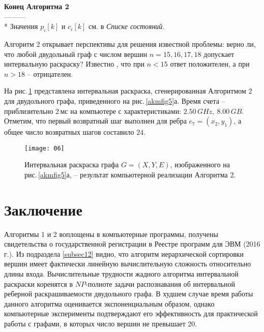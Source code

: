 \textbf{ Конец Алгоритма 2}\\
---------\\
* Значения $p_i[k]$ и $c_i[k]$ см. в \textit{ Списке состояний}.
\par\medskip
Алгоритм 2 открывает перспективы для решения известной проблемы: верно ли, что любой двудольный граф с числом вершин $n=15,16,17,18$ допускает интервальную раскраску? Известно \cite{akm-15Giaro}, что при $n<15$ ответ положителен, а при $n>18$ -- отрицателен.

На рис.\,\ref{akmfig6} представлена интервальная раскраска, сгенерированная Алгоритмом 2 для двудольного графа, приведенного на рис.\,\ref{akmfig5}а. Время счета -- приблизительно 2\,мс на компьютере с характеристиками: $2.50\,GHz,\ 8.00\,GB$. Отметим, что первый возвратный шаг выполнен для ребра $e_7=(x_2, y_1)$, а общее число возвратных шагов составило $24$.
\begin{figure}[H]
\centerline{\texttt{[image: 06]}}
\caption{Интервальная раскраска графа ${G=(X,Y,E)}$, изображенного на рис.\,\ref{akmfig5}а, -- \vspace{-1mm} результат компьютерной реализации Алгоритма 2.}
\label{akmfig6}
\end{figure}
\par\medskip
\section{Заключение}
Алгоритмы 1 и 2 воплощены в компьютерные программы, получены  свидетельства о государственной регистрации в Реестре программ для ЭВМ (2016 г.).
Из подраздела \ref{subsec12} видно, что алгоритм иерархической сортировки вершин имеет фактически линейную вычислительную сложность относительно длины входа. Вычислительные трудности жадного алгоритма интервальной раскраски коренятся в $NP$-полноте задачи распознавания об интервальной реберной раскрашиваемости двудольного графа. В худшем случае время работы данного алгоритма оценивается экспоненциальным образом, однако компьютерные эксперименты подтверждают его эффективность для практической работы с графами, в которых число вершин не превышает 20.

